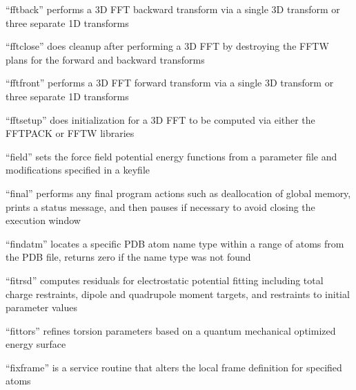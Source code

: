 \documentclass[letterpaper,11pt,english]{sphinxmanual}
\begin{document}

“fftback” performs a 3\sphinxhyphen{}D FFT backward transform via a single
3\sphinxhyphen{}D transform or three separate 1\sphinxhyphen{}D transforms


“fftclose” does cleanup after performing a 3\sphinxhyphen{}D FFT by destroying
the FFTW plans for the forward and backward transforms


“fftfront” performs a 3\sphinxhyphen{}D FFT forward transform via a single
3\sphinxhyphen{}D transform or three separate 1\sphinxhyphen{}D transforms


“fftsetup” does initialization for a 3\sphinxhyphen{}D FFT to be computed
via either the FFTPACK or FFTW libraries


“field” sets the force field potential energy functions from
a parameter file and modifications specified in a keyfile


“final” performs any final program actions such as deallocation
of global memory, prints a status message, and then pauses if
necessary to avoid closing the execution window


“findatm” locates a specific PDB atom name type within a
range of atoms from the PDB file, returns zero if the name
type was not found


“fitrsd” computes residuals for electrostatic potential fitting
including total charge restraints, dipole and quadrupole moment
targets, and restraints to initial parameter values


“fittors” refines torsion parameters based on a quantum
mechanical optimized energy surface


“fixframe” is a service routine that alters the local frame
definition for specified atoms

\end{document}
